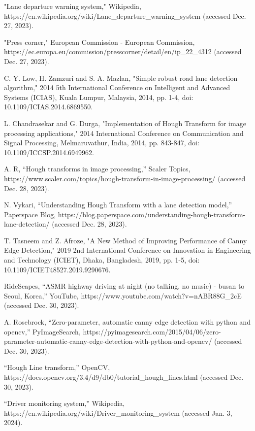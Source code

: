 \documentclass[10pt,conference]{IEEEtran}
\begin{document}
\begin{thebibliography}{00}

     "Lane departure warning system," Wikipedia, https://en.wikipedia.org/wiki/Lane\_departure\_warning\_system (accessed Dec. 27, 2023).

     "Press corner," European Commission - European Commission, https://ec.europa.eu/commission/presscorner/detail/en/ip\_22\_4312 (accessed Dec. 27, 2023).

     C. Y. Low, H. Zamzuri and S. A. Mazlan, "Simple robust road lane detection algorithm," 2014 5th International Conference on Intelligent and Advanced Systems (ICIAS), Kuala Lumpur, Malaysia, 2014, pp. 1-4, doi: 10.1109/ICIAS.2014.6869550.

     L. Chandrasekar and G. Durga, "Implementation of Hough Transform for image processing applications," 2014 International Conference on Communication and Signal Processing, Melmaruvathur, India, 2014, pp. 843-847, doi: 10.1109/ICCSP.2014.6949962.

     A. R, “Hough transforms in image processing,” Scaler Topics, https://www.scaler.com/topics/hough-transform-in-image-processing/ (accessed Dec. 28, 2023).

     N. Vykari, “Understanding Hough Transform with a lane detection model,” Paperspace Blog, https://blog.paperspace.com/understanding-hough-transform-lane-detection/ (accessed Dec. 28, 2023).

     T. Tasneem and Z. Afroze, "A New Method of Improving Performance of Canny Edge Detection," 2019 2nd International Conference on Innovation in Engineering and Technology (ICIET), Dhaka, Bangladesh, 2019, pp. 1-5, doi: 10.1109/ICIET48527.2019.9290676.

     RideScapes, “ASMR highway driving at night (no talking, no music) - busan to Seoul, Korea,” YouTube, https://www.youtube.com/watch?v=nABR88G\_2cE (accessed Dec. 30, 2023).

     A. Rosebrock, “Zero-parameter, automatic canny edge detection with python and opencv,” PyImageSearch, https://pyimagesearch.com/2015/04/06/zero-parameter-automatic-canny-edge-detection-with-python-and-opencv/ (accessed Dec. 30, 2023).

     “Hough Line transform,” OpenCV, https://docs.opencv.org/3.4/d9/db0/tutorial\_hough\_lines.html (accessed Dec. 30, 2023).

     “Driver monitoring system,” Wikipedia, https://en.wikipedia.org/wiki/Driver\_monitoring\_system (accessed Jan. 3, 2024).


\end{thebibliography}
\end{document}
